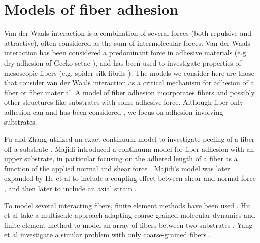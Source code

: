 

\section{Models of fiber adhesion}


	Van der Waals interaction is a combination of several forces (both repulsive and attractive), often considered as the sum of intermolecular forces. Van der Waals interaction has been considered a predominant force in adhesive materials (e.g. dry adhesion of Gecko setae \cite{Autumn2002}), and has been used to investigate properties of mesoscopic fibers (e.g. spider silk fibrils \cite{Cranford2013}). The models we consider here are those that consider van der Waals interaction as a critical mechanism for adhesion of a fiber or fiber material. A model of fiber adhesion incorporates fibers and possibly other structures like substrates with some adhesive force. Although fiber only adhesion can and has been considered \cite{Li2011}, we focus on adhesion involving substrates. 
	
	Fu and Zhang utilized an exact continuum model to investigate peeling of a fiber off a substrate \cite{fu2011}. Majidi introduced a continuum model for fiber adhesion with an upper substrate, in particular focusing on the adhered length of a fiber as a function of the applied normal and shear force \cite{Majidi2009}. Majidi's model was later expanded by He et al to include a coupling effect between shear and normal force \cite{He2012}, and then later to include an axial strain \cite{He2013}. 
	
	To model several interacting fibers, finite element methods have been used \cite{Radhakrishnan2013}. Hu et al take a multiscale approach adapting coarse-grained molecular dynamics and finite element method to model an array of fibers between two substrates \cite{Hu2010}. Yang et al investigate a similar problem with only coarse-grained fibers \cite{Yang2012}.
	
